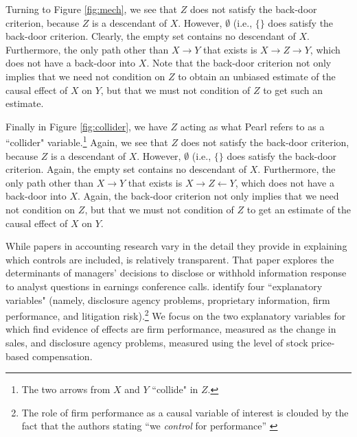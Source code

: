 \documentclass[11pt]{amsart}
\begin{document}
Turning to Figure \ref{fig:mech}, we see that $Z$ does not satisfy the back-door criterion, because $Z$ is a descendant of $X$.
However, $\emptyset$ (i.e., $\{\}$ does satisfy the back-door criterion.
Clearly, the empty set contains no descendant of $X$.
Furthermore, the only path other than $X \rightarrow Y$ that exists is $X \rightarrow Z \rightarrow Y$, which does not have a back-door into $X$.
Note that the back-door criterion not only implies that we need not condition on $Z$ to obtain an unbiased estimate of the causal effect of $X$ on $Y$, but that we must not condition of $Z$ to get such an estimate.

Finally in Figure \ref{fig:collider}, we have $Z$ acting as what Pearl refers to as a ``collider" variable.\footnote{
The two arrows from $X$ and $Y$ ``collide" in $Z$.} %
Again, we see that $Z$ does not satisfy the back-door criterion, because $Z$ is a descendant of $X$.
However, $\emptyset$ (i.e., $\{\}$ does satisfy the back-door criterion.
Again, the empty set contains no descendant of $X$.
Furthermore, the only path other than $X \rightarrow Y$ that exists is $X \rightarrow Z \leftarrow Y$, which does not have a back-door into $X$.
Again, the back-door criterion not only implies that we need not condition on $Z$, but that we must not condition of $Z$ to get an estimate of the causal effect of $X$ on $Y$.

While papers in accounting research vary in the detail they provide in explaining which controls are included,  \cite{Hollander:2010jg} is relatively transparent. 
That paper explores the determinants of managers' decisions to disclose or withhold information response to analyst questions in earnings conference calls.
\cite{Hollander:2010jg} identify four ``explanatory variables" (namely, disclosure agency problems, proprietary information, firm performance, and litigation risk).\footnote{The role of firm performance as a causal variable of interest is clouded by the fact that the authors stating ``we \emph{control} for performance'' \citep[p.544]{Hollander:2010jg}}
We focus on the two explanatory variables for which \citet{Hollander:2010jg} find evidence of effects are firm performance, measured as the change in sales, and disclosure agency problems, measured using the level of stock price-based compensation.
\end{document}
